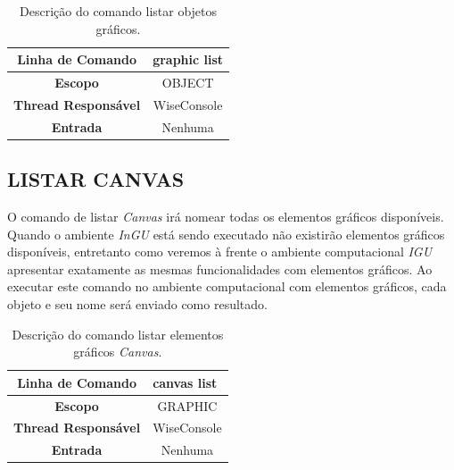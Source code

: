 \begin{center}
	\begin{table}[!htbp]
		\begin{tabularx}{\textwidth}{c|X}
			\toprule
			\textbf{Linha de Comando} & graphic list \\
			\midrule
			\textbf{Escopo} & \multicolumn{1}{c}{OBJECT} \\
			\hline
			\textbf{Thread Responsável} & \multicolumn{1}{c}{WiseConsole} \\
			\hline
			\textbf{Entrada} & \multicolumn{1}{c}{Nenhuma}. \\
			\bottomrule
		\end{tabularx}
		\caption{Descrição do comando listar objetos gráficos.}
		\label{tab:graphic_list}
	\end{table}
\end{center}

\subsection{LISTAR CANVAS}\label{sec:canvas_list}

O comando de listar \textit{Canvas} irá nomear todas os elementos gráficos disponíveis. Quando o ambiente \textit{InGU} está sendo executado não existirão elementos gráficos disponíveis, entretanto como veremos à frente o ambiente computacional \textit{IGU} apresentar exatamente as mesmas funcionalidades com elementos gráficos. Ao executar este comando no ambiente computacional com elementos gráficos, cada objeto e seu nome será enviado como resultado.

\begin{center}
	\begin{table}[!htbp]
		\begin{tabularx}{\textwidth}{c|X}
			\toprule
			\textbf{Linha de Comando} & canvas list \\
			\midrule
			\textbf{Escopo} & \multicolumn{1}{c}{GRAPHIC} \\
			\hline
			\textbf{Thread Responsável} & \multicolumn{1}{c}{WiseConsole} \\
			\hline
			\textbf{Entrada} & \multicolumn{1}{c}{Nenhuma}. \\
			\bottomrule
		\end{tabularx}
		\caption{Descrição do comando listar elementos gráficos \textit{Canvas}.}
		\label{tab:canvas_list}
	\end{table}
\end{center}

